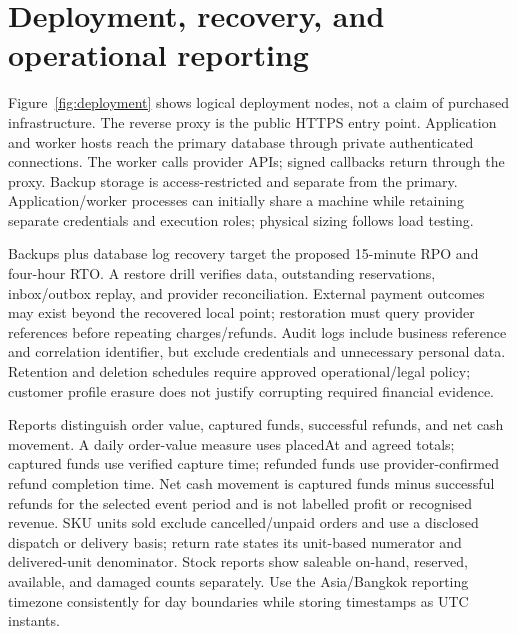 \section{Deployment, recovery, and operational reporting}
Figure~\ref{fig:deployment} shows logical deployment nodes, not a claim of purchased infrastructure. The reverse proxy is the public HTTPS entry point. Application and worker hosts reach the primary database through private authenticated connections. The worker calls provider APIs; signed callbacks return through the proxy. Backup storage is access-restricted and separate from the primary. Application/worker processes can initially share a machine while retaining separate credentials and execution roles; physical sizing follows load testing.

Backups plus database log recovery target the proposed 15-minute RPO and four-hour RTO. A restore drill verifies data, outstanding reservations, inbox/outbox replay, and provider reconciliation. External payment outcomes may exist beyond the recovered local point; restoration must query provider references before repeating charges/refunds. Audit logs include business reference and correlation identifier, but exclude credentials and unnecessary personal data. Retention and deletion schedules require approved operational/legal policy; customer profile erasure does not justify corrupting required financial evidence.

Reports distinguish order value, captured funds, successful refunds, and net cash movement. A daily order-value measure uses placedAt and agreed totals; captured funds use verified capture time; refunded funds use provider-confirmed refund completion time. Net cash movement is captured funds minus successful refunds for the selected event period and is not labelled profit or recognised revenue. SKU units sold exclude cancelled/unpaid orders and use a disclosed dispatch or delivery basis; return rate states its unit-based numerator and delivered-unit denominator. Stock reports show saleable on-hand, reserved, available, and damaged counts separately. Use the Asia/Bangkok reporting timezone consistently for day boundaries while storing timestamps as UTC instants.

